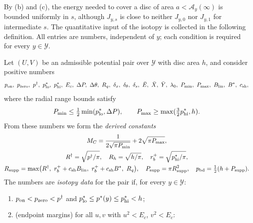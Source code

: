 By (b) and (c), the energy needed to cover a disc of area $a<\mathcal A_y(\infty)$ is bounded uniformly in $s$, although
$J_{y,s}$ is close to neither $J_{y,0}$ nor $J_{y,1}$ for intermediate $s$. The quantitative input of the isotopy is collected in the following definition. All
entries are numbers, independent of $y$; each condition is required for every $y\in\mathcal Y$.

\begin{definition}\label{def:pln-isotopy-data}
Let $(U,V)$ be an admissible potential pair over $\mathcal Y$ with disc area $h$, and consider positive numbers
\[
 p_{\rm on},\ p_{\rm zero},\ p^\dagger,\ p^*_{\rm lo},\ p^*_{\rm hi},\ E_c,\ \Delta P,\ \Delta\theta,\ R_q,\ \delta_x,\ \delta_\theta,\
 \delta_s,\ \bar E,\ \bar X,\ \bar Y,\ \lambda_0,\ P_{\min},\ P_{\max},\ B_{\rm lin},\ B^*,\ c_{\rm sh},
\]
where the radial range bounds satisfy
\[
 P_{\min}\le\tfrac12\min(p^*_{\rm lo},\Delta P),\qquad P_{\max}\ge\max(\tfrac32p^*_{\rm hi},h).
\]
From these numbers we form the \emph{derived constants}
\begin{gather*}
 M_C=\frac1{2\sqrt{\pi P_{\min}}}+2\sqrt{\pi P_{\max}},\\
 R^\dagger=\sqrt{p^\dagger/\pi},\quad R_h=\sqrt{h/\pi},\quad r_b^+=\sqrt{p^*_{\rm hi}/\pi},\\
 R_{\rm supp}=\max\bigl(R^\dagger,\ r_b^++c_{\rm sh}B_{\rm lin},\ r_b^++c_{\rm sh}B^*,\ R_q\bigr),\quad P_{\rm supp}=\pi R_{\rm supp}^2,\quad
 p_{\rm bd}=\tfrac12(h+P_{\rm supp}).
\end{gather*}
The numbers are \emph{isotopy data} for the pair if, for every $y\in\mathcal Y$:
\begin{enumerate}[label=(D\arabic*)]
\item\label{it:pln-D1} $p_{\rm on}<p_{\rm zero}<p^\dagger$ and $p^*_{\rm lo}\le p^*(y)\le p^*_{\rm hi}<h$;
\item\label{it:pln-D2} (endpoint margins) for all $u,v$ with $u^2<E_c$, $v^2<E_c$:

\end{enumerate}
\end{definition}
